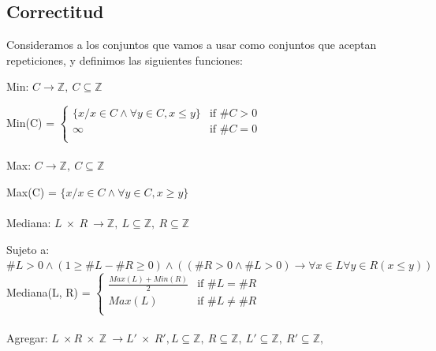 \documentclass{article}
\theoremstyle{definition}
\theoremstyle{remark}
\begin{document}
\subsection{Correctitud}

Consideramos a los conjuntos que vamos a usar como conjuntos que aceptan repeticiones, y definimos las siguientes funciones:

\newcommand{\twopartdef}[4]
{
	\left\{
		\begin{array}{ll}
			#1 & \mbox{if } #2 \\
			#3 & \mbox{if } #4 \\
		\end{array}
	\right.
}

\newcommand{\fourpartdef}[8]
{
	\left\{
		\begin{array}{ll}
			#1 & \mbox{if } #2 \\
			#3 & \mbox{if } #4 \\
			#5 & \mbox{if } #6 \\
			#7 & \mbox{if } #8 \\
		\end{array}
	\right.
}

    Min: $C \rightarrow \mathds{Z} , \  C \subseteq \mathds{Z} $  
    
    Min(C) = $\twopartdef{ \{x / x \in C  \wedge \forall y \in C, x \leq y\} }{\#C > 0}{\infty}{\#C = 0}$ \\ \\

    Max: $C \rightarrow \mathds{Z} , \  C \subseteq \mathds{Z} $ 
    
    Max(C) = $\{x / x \in C  \wedge \forall y \in C, x \geq y\}$ \\ \\

    Mediana: $L \  \times\  R \  \rightarrow \mathds{Z}, \ L \subseteq \mathds{Z}, \ R \subseteq \mathds{Z}$
    
    Sujeto a:  $\#L > 0  \wedge  (1 \geq \#L - \#R \geq 0) \wedge ((\#R > 0 \wedge \#L > 0) \rightarrow \forall x \in L \forall y \in R (x \leq y) )$ \\ 
    
    Mediana(L, R) = $\twopartdef { \frac{Max(L) + Min(R)}{2} } {\#L = \#R} {Max(L)} {\#L \neq \#R}$\\ \\

    
    
    Agregar: $L\ \times R\ \times\ \mathds{Z}\ \rightarrow L'\  \times\  R', L \subseteq \mathds{Z}, \ R \subseteq \mathds{Z}, \ L' \subseteq \mathds{Z}, \ R' \subseteq \mathds{Z}, \ $\\
    
\end{document}
